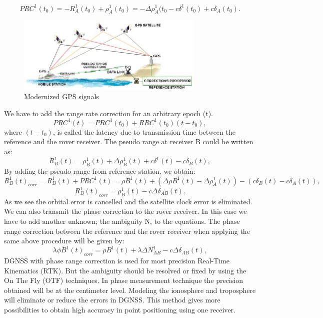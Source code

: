 \begin{equation}
	\label{equ:diferential_pos2}
	PRC^{1}(t_{0}) = -R^{1}_{A}(t_{0}) + \rho^{1}_{A}(t_{0}) = -\Delta \rho^{1}_{A}(t_{0}
	- c \delta^{1}(t_{0}) + c \delta_{A}(t_{0}).
\end{equation}

\begin{figure}[htb] 
	\label{fig:gps_correction}
	\centering
	\includegraphics[width=0.8\textwidth]{figures/gps_correction}
	\caption{Modernized GPS signals}
\end{figure}
We have to add the range rate correction for an arbitrary epoch (t).
\begin{equation}
	\label{equ:range_rate_correction}
	PRC^{1}(t) = PRC^{1}(t_{0}) + RRC^{1}(t_{0})(t-t_{0}),
\end{equation}
where $(t-t_{0})$, is called the latency due to transmission time between  the reference and 
the rover receiver.
The pseudo range at receiver B could be written as:
\begin{equation}
	\label{equ:reciever_pseudorange}
	R_{B}^{1}(t) = \rho^{1}_{B}(t) + \Delta \rho^{1}_{B}(t) + c \delta^{1}(t)- c \delta_{B}(t),
\end{equation}
By adding the pseudo range from reference station, we obtain:
\begin{equation}
	\label{equ:pseudorange_with_ref1}
	R_{B}^{1}(t)_{corr} = R_{B}^{1}(t) + PRC^{1}(t) = \rho B^{1}(t)+(\Delta \rho B^{1}(t)-
	\Delta \rho^{1}_{A}(t)) - ( c \delta_{B}(t) - c \delta_{A}(t)),
\end{equation}
\begin{equation}
	\label{equ:pseudorange_with_ref2}
	R_{B}^{1}(t)_{corr} = \rho^{1}_{B}(t) - c \Delta \delta_{AB}(t).
\end{equation}
As we see the orbital error is cancelled and the satellite clock error is eliminated. We can also
transmit the phase correction to the rover receiver. In this case we have to add another unknown;
the ambiguity N, to the equations. The phase range correction between the reference and the
rover receiver when applying the same above procedure will be given by:
\begin{equation}
	\label{equ:phase_label_corr}
	\lambda \phi B^{1}(t)_{corr} = \rho B^{1}(t)+\lambda \Delta N^{1}_{AB}-c\Delta \delta_{AB}(t),
\end{equation}
DGNSS with phase range correction is used for most precision Real-Time Kinematics (RTK).
But the ambiguity should be resolved or fixed by using the On The Fly (OTF) techniques. In
phase measurement technique the precision obtained will be at the centimeter level. Modeling
the ionosphere and troposphere will eliminate or reduce the errors in DGNSS. This method gives
more possibilities to obtain high accuracy in point positioning using one receiver.
